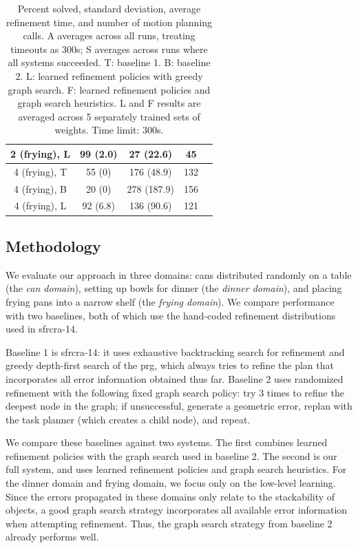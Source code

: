 \begin{table}[t]
{\begin{tabular}{ccccc}
    \midrule
      2 (frying), L & 99 (2.0) & 27 (22.6) & 45\\
    \midrule[1.5pt]
      4 (frying), T & 55 (0) & 176 (48.9) & 132\\
    \midrule
      4 (frying), B & 20 (0) & 278 (187.9) & 156\\
    \midrule
      4 (frying), L & 92 (6.8) & 136 (90.6) & 121\\
    \bottomrule[1.5pt]
  \end{tabular}}
  \caption{\small{Percent solved, standard deviation, average refinement time, and number of motion
      planning calls. A averages across all runs, treating timeouts as 300s; S averages across runs where all systems succeeded.
      T: baseline 1. B: baseline 2.
      L: learned refinement policies with greedy graph search.
      F: learned refinement policies and graph
      search heuristics. L and F results are averaged across 5
      separately trained sets of weights. Time limit: 300s.}}
  \label{table:results}
\end{table}

\subsection{Methodology}
We evaluate our approach in three domains: cans distributed randomly
on a table (the \emph{can domain}), setting up bowls for dinner (the
\emph{dinner domain}), and placing frying pans into a narrow shelf
(the \emph{frying domain}).  We compare performance with two
baselines, both of which use the hand-coded refinement distributions
used in {\sc sfrcra-14}.

Baseline 1 is {\sc sfrcra-14}: it uses exhaustive backtracking search
for refinement and greedy depth-first search of the {\sc prg}, which
always tries to refine the plan that incorporates all error
information obtained thus far.  Baseline 2 uses randomized refinement
with the following fixed graph search policy: try 3 times to refine
the deepest node in the graph; if unsuccessful, generate a geometric
error, replan with the task planner (which creates a child node), and
repeat.

We compare these baselines against two systems. The first combines
learned refinement policies with the graph search used in baseline
2. The second is our full system, and uses learned refinement policies
and graph search heuristics.  For the dinner domain and frying domain,
we focus only on the low-level learning. Since the errors propagated in these
domains only relate to the stackability of objects, a good graph search strategy
incorporates all available error information when
attempting refinement. Thus, the graph search strategy from baseline 2
already performs well.

